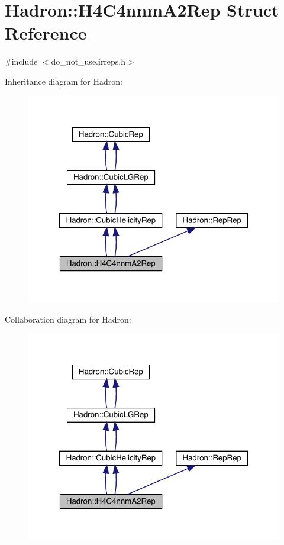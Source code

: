 \hypertarget{structHadron_1_1H4C4nnmA2Rep}{}\section{Hadron\+:\+:H4\+C4nnm\+A2\+Rep Struct Reference}
\label{structHadron_1_1H4C4nnmA2Rep}


{\ttfamily \#include $<$do\+\_\+not\+\_\+use.\+irreps.\+h$>$}



Inheritance diagram for Hadron\+:\nopagebreak
\begin{figure}[H]
\begin{center}
\leavevmode
\includegraphics[width=320pt]{de/dca/structHadron_1_1H4C4nnmA2Rep__inherit__graph}
\end{center}
\end{figure}


Collaboration diagram for Hadron\+:\nopagebreak
\begin{figure}[H]
\begin{center}
\leavevmode
\includegraphics[width=320pt]{d5/d16/structHadron_1_1H4C4nnmA2Rep__coll__graph}
\end{center}
\end{figure}
